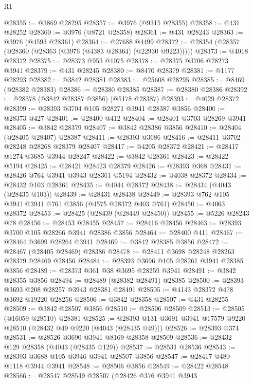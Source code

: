 \begin{lexlean}{R1}
\begin{coremodule}
@28355 := @3869 @28295
@28357 := @3976 (@9315 @28355)
@28358 := @431 @28252
@28360 := @3976 (@8721 @28358)
@28361 := @431 @28243
@28363 := @3976 (@4593 @28361)
@28364 := @27688 @4499
@28372 := @28354 (@28357 (@28360 (@28363 (@3976 (@4383 @28364) (@22930 @9223)))))
@28373 := @4018 @28372
@28375 := @28373 @953 @1075
@28378 := @28375 @3706 @28273 @3941
@28379 := @431 @28245
@28380 := @8470 @28379
@28381 := @1177 @28293
@28382 := @3842 @28381
@28383 := @25608 @28295
@28385 := @8469 (@28382 @28383)
@28386 := @28380 @28385
@28387 := @28380 @28386
@28392 := @28378 (@3842 @28387 @3856) (@5178 @28387)
@28393 := @4029 @28372
@28399 := @28393 @3704 @105 @28271 @3941 @28387 @3856
@28400 := @28373 @427
@28401 := @28400 @412
@28404 := @28401 @3703 @28269 @3941
@28405 := @3842 @28379
@28407 := @3842 @28386 @3856
@28410 := @28404 (@28405 @28407) @28387
@28411 := @28393 @3686
@28416 := @28411 @3702 @28248 @28268 @28379 @28407
@28417 := @4205 @28372
@28421 := @28417 @1274 @3685 @3944 @28247
@28422 := @3842 @28361
@28423 := @28422 @5194
@28425 := @28421 @28423 @28379
@28426 := @28393 @368
@28431 := @28426 @764 @3941 @3943 @28361 @5194
@28432 := @4038 @28372
@28434 := @28432 @103 @28361
@28435 := @4044 @28372
@28438 := @28434 (@4043 (@28435 @103))
@28439 := @28431 @28438
@28449 := @28393 @762 @105 @3941 @3941 @761 @3856 (@4575 @28372 @403 @761)
@28450 := @4063 @28372
@28453 := @28425 (@28439 (@28449 @28450))
@28455 := @5226 @28243 @78
@28456 := @28453 @28455
@28457 := @28416 @28456
@28463 := @28393 @3700 @105 @28266 @3941 @28386 @3856
@28464 := @28400 @411
@28467 := @28464 @3699 @28264 @3941
@28469 := @3842 @28385 @3856
@28472 := @28467 (@28405 @28469) @28386
@28478 := @28411 @3698 @28248 @28263 @28379 @28469 @28456
@28484 := @28393 @3696 @105 @28261 @3941 @28385 @3856
@28489 := @28373 @361 @38 @3695 @28259 @3941
@28491 := @3842 @28355 @3856
@28494 := @28489 (@28382 @28491) @28385
@28500 := @28393 @3693 @208 @28257 @3943 @28381 @28491
@28505 := @4143 @28372 @478 @3692 @19220 @28256
@28506 := @3842 @28358
@28507 := @431 @28255
@28509 := @3842 @28507 @3856
@28510 := @28506 @28509
@28513 := @28505 (@16059 @28510) @28381
@28525 := @28393 @131 @3691 @3941 @17579 @9220 @28510 (@28432 @49 @9220 (@4043 (@28435 @49)))
@28526 := @28393 @374
@28531 := @28526 @3690 @3941 @8169 @28358 @28509
@28536 := @28432 @129 @28358 (@4043 (@28435 @129))
@28537 := @28531 @28536
@28543 := @28393 @3688 @105 @3946 @3941 @28507 @3856
@28547 := @28417 @480 @1118 @3944 @3941
@28548 := @28506 @3856
@28549 := @28422 @28548
@28566 := @28547
    @28549
    @28507
    (@28426
      @376
      @3941
      @3943

\end{coremodule}
\end{lexlean}
